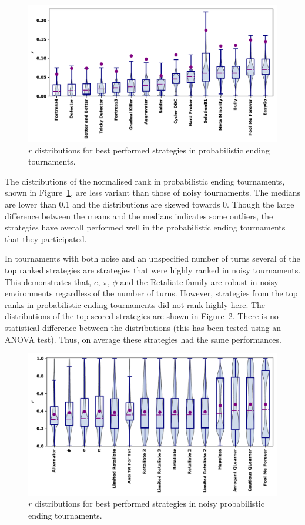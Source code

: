 \documentclass{article}
\begin{document}
\begin{figure}[h!]
    \centering
    \includegraphics[width=.55\textwidth]{../images/performance_probend.pdf}
    \caption{\(r\) distributions for best performed strategies in probabilistic ending tournaments.}
    \label{fig:probend_results}
\end{figure}

The distributions of the normalised rank in probabilistic ending tournaments,
shown in
Figure~\ref{fig:probend_results}, are less variant than those of noisy
tournaments. The medians are lower than 0.1 and the distributions are skewed
towards 0. Though the large difference between the means and the medians
indicates some outliers, the strategies have overall performed well in the
probabilistic ending tournaments that they participated.

In tournaments with both noise and an unspecified number of turns several of
the top ranked strategies are strategies that were highly ranked in noisy
tournaments. This demonstrates that, $e$, $\pi$,
$\phi$ and the Retaliate family are robust in noisy environments regardless of the
number of turns. However, strategies from the top ranks in probabilistic
ending tournaments did not rank highly here. The distributions of the top scored
strategies are shown in Figure~\ref{fig:noisy_probend_results}. There is no
statistical difference between the distributions (this has been tested using
an ANOVA test). Thus, on average these strategies had the same performances.

\begin{figure}[!htbp]
    \centering
    \includegraphics[width=.55\textwidth]{../images/performance_probend_noise.pdf}
    \caption{\(r\) distributions for best performed strategies in noisy
    probabilistic ending tournaments.}
    \label{fig:noisy_probend_results}
\end{figure}
\end{document}
